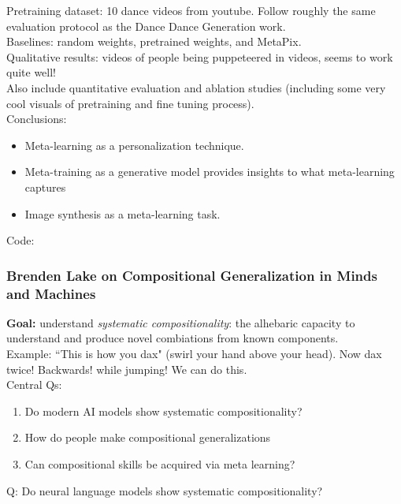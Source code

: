 Pretraining dataset: 10 dance videos from youtube. Follow roughly the same evaluation protocol as the Dance Dance Generation work. \\

Baselines: random weights, pretrained weights, and MetaPix. \\

Qualitative results: videos of people being puppeteered in videos, seems to work quite well! \\

Also include quantitative evaluation and ablation studies (including some very cool visuals of pretraining and fine tuning process). \\

Conclusions:
\begin{itemize}
    \item Meta-learning as a personalization technique.
    \item Meta-training as a generative model provides insights to what meta-learning captures
    \item Image synthesis as a meta-learning task.
\end{itemize}

Code: 

\subsubsection{Brenden Lake on Compositional Generalization in Minds and Machines}

{\bf Goal:} understand {\it systematic compositionality}: the alhebaric capacity to understand and produce novel combiations from known components. \\

Example: ``This is how you dax" (swirl your hand above your head). Now dax twice! Backwards! while jumping! We can do this. \\

Central Qs:
\begin{enumerate}
    \item Do modern AI models show systematic compositionality?
    \item How do people make compositional generalizations
    \item Can compositional skills be acquired via meta learning?
\end{enumerate}

Q: Do neural language models show systematic compositionality? \\

